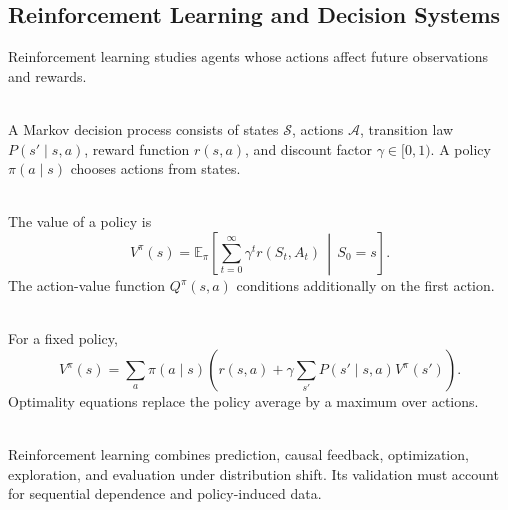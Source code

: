 \subsection{Reinforcement Learning and Decision Systems}

Reinforcement learning studies agents whose actions affect future observations and rewards.

\begin{definition} \label{def:sl-markov-decision-process} \\
A Markov decision process consists of states $\mathcal{S}$, actions $\mathcal{A}$, transition law $P(s'\mid s,a)$, reward function $r(s,a)$, and discount factor $\gamma\in[0,1)$.  A policy $\pi(a\mid s)$ chooses actions from states.
\end{definition}

\begin{definition} \label{def:sl-value-functions} \\
The value of a policy is
\[
V^{\pi}(s)=
\mathbb{E}_{\pi}\left[\sum_{t=0}^{\infty}\gamma^t r(S_t,A_t)\,\middle|\,S_0=s\right].
\]
The action-value function $Q^{\pi}(s,a)$ conditions additionally on the first action.
\end{definition}

\begin{definition} \label{def:sl-bellman-equation} \\
For a fixed policy,
\[
V^{\pi}(s)=
\sum_a\pi(a\mid s)\left(r(s,a)+\gamma\sum_{s'}P(s'\mid s,a)V^{\pi}(s')\right).
\]
Optimality equations replace the policy average by a maximum over actions.
\end{definition}

\begin{remark} \label{rem:sl-rl-learning-systems} \\
Reinforcement learning combines prediction, causal feedback, optimization, exploration, and evaluation under distribution shift.  Its validation must account for sequential dependence and policy-induced data.
\end{remark}
